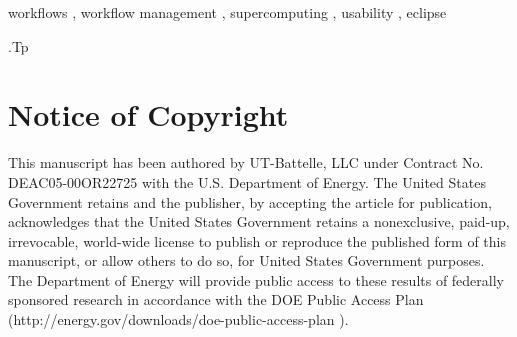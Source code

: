 \documentclass{elsart}
\begin{document}
\begin{frontmatter}
\begin{abstract}
\end{abstract}

\begin{keyword}
workflows
\sep 
workflow management
\sep
supercomputing
\sep
usability
\sep
eclipse

\vspace{1ex}

.Tp %

\end{keyword}

\end{frontmatter}

\section{Notice of Copyright}\label{notice-of-copyright}

This manuscript has been authored by UT-Battelle, LLC under Contract No.
DEAC05-00OR22725 with the U.S. Department of Energy. The United States
Government retains and the publisher, by accepting the article for
publication, acknowledges that the United States Government retains a
nonexclusive, paid-up, irrevocable, world-wide license to publish or
reproduce the published form of this manuscript, or allow others to do
so, for United States Government purposes. The Department of Energy will
provide public access to these results of federally sponsored research
in accordance with the DOE Public Access Plan
(http://energy.gov/downloads/doe-public-access-plan ).





\end{document}
